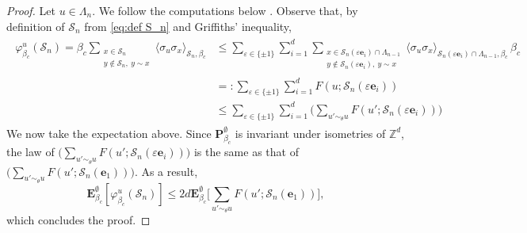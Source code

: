 \documentclass[10pt,a4paper]{amsart}
\numberwithin{equation}{section}
\begin{document}
\begin{proof} Let $u\in \Lambda_n$. We follow the computations below \cite[Equation~(2.15)]{DuminilPanis2024newLB}. Observe that, by definition of $\mathcal S_n$ from \eqref{eq:def S_n} and Griffiths' inequality, 
\begin{align}\label{eq:pf lem prop 1}
\begin{aligned}
	\varphi_{\beta_c}^u(\mathcal S_n)=\beta_c\sum_{\substack{x\in \mathcal S_n\\ y\notin \mathcal S_n, \: y \sim x\\ }}\langle \sigma_u\sigma_x\rangle_{\mathcal S_n,\beta_c}&\leq \sum_{\varepsilon\in \{\pm 1\}}\sum_{i=1}^d \sum_{\substack{x\in \mathcal S_n(\varepsilon\mathbf{e}_i)\cap \Lambda_{n-1}\\y\notin \mathcal S_n(\varepsilon\mathbf{e}_i), \: y\sim x}}\langle \sigma_u\sigma_x\rangle_{\mathcal S_n(\varepsilon\mathbf{e}_i)\cap \Lambda_{n-1},\beta_c}\,\beta_c
	\\&=: \sum_{\varepsilon\in \{\pm 1\}}\sum_{i=1}^d F(u;\mathcal S_n(\varepsilon \mathbf{e}_i))\\&\leq \sum_{\varepsilon\in \{\pm 1\}}\sum_{i=1}^d \Big(\sum_{u'\sim_\theta u} F(u';\mathcal S_n(\varepsilon \mathbf{e}_i))\Big)
	\end{aligned}
\end{align}
We now take the expectation above. Since $\mathbf P_{\beta_c}^\emptyset$ is invariant under isometries of $\mathbb Z^d$, the law of $\Big(\sum_{u'\sim_\theta u} F(u';\mathcal S_n(\varepsilon \mathbf{e}_i))\Big)$ is the same as that of $\Big(\sum_{u'\sim_\theta u} F(u';\mathcal S_n(\mathbf{e}_1))\Big)$.
As a result,
\begin{equation}
	\mathbf E_{\beta_c}^\emptyset[\varphi_{\beta_c}^u(\mathcal S_n)]\leq 2d \mathbf E_{\beta_c}^\emptyset\Big[\sum_{u'\sim_\theta u} F(u';\mathcal S_n(\mathbf{e}_1))\Big],
\end{equation}
which concludes the proof.
\end{proof}
\end{document}

